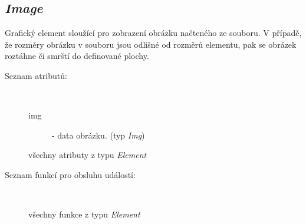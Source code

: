 \documentclass[11pt,twoside,a4paper]{book}
\begin{document}
\subsection{\textit{Image}}
Grafický element sloužící pro zobrazení obrázku načteného ze souboru. V případě, že rozměry obrázku v souboru jsou odlišné od rozměrů elementu, pak se obrázek roztáhne či smrští do definované plochy.\\
\begin{description}
\item[Seznam atributů:] ~
\begin{description}
\item[img] - data obrázku. (typ \textit{Img})
\item[všechny atributy z typu \textit{Element}]
\end{description}
\item[Seznam funkcí pro obsluhu událostí:] ~
\begin{description}
\item[všechny funkce z typu \textit{Element}]
\end{description}
\end{description}
\end{document}

